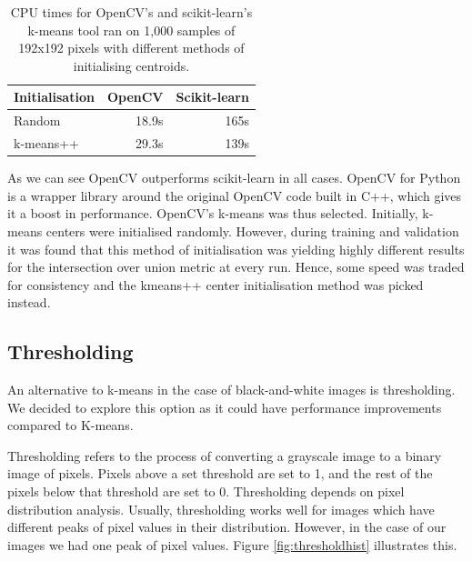 \begin{table}[]
\centering
\begin{tabular}{|l|l|l|}
\hline
\textbf{Initialisation} & \textbf{OpenCV} & \textbf{Scikit-learn} \\ \hline
Random                                   & \multicolumn{1}{r|}{18.9s}       & \multicolumn{1}{r|}{165s}              \\ \hline
k-means++                                & \multicolumn{1}{r|}{29.3s}       & \multicolumn{1}{r|}{139s}              \\ \hline
\end{tabular}

\caption{CPU times for OpenCV's and scikit-learn's k-means tool ran on 1,000 samples of 192x192 pixels with different methods of initialising centroids.}
\end{table}

As we can see OpenCV outperforms scikit-learn in all cases. OpenCV for Python is a wrapper library around the original OpenCV code built in C++, which gives it a boost in performance. OpenCV's k-means was thus selected. Initially, k-means centers were initialised randomly. However, during training and validation it was found that this method of initialisation was yielding highly different results for the intersection over union metric at every run. Hence, some speed was traded for consistency and the kmeans++ center initialisation method was picked instead.

\subsection{Thresholding}

An alternative to k-means in the case of black-and-white images is thresholding. We decided to explore this option as it could have performance improvements compared to K-means.

Thresholding refers to the process of converting a grayscale image to a binary image of pixels. Pixels above a set threshold are set to 1, and the rest of the pixels below that threshold are set to 0. Thresholding depends on pixel distribution analysis. Usually, thresholding works well for images which have different peaks of pixel values in their distribution. However, in the case of our images we had one peak of pixel values. Figure \ref{fig:thresholdhist} illustrates this.

